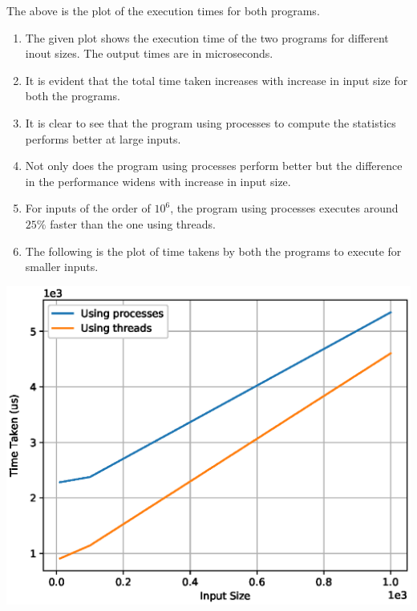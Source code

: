 \documentclass[a4paper,12pt]{report}
\begin{document}
The above is the plot of the execution times for both programs.
\newpage
\begin{enumerate}  
\item The given plot shows the execution time of the two programs for different inout sizes. The output times are in microseconds.
\item It is evident that the total time taken increases with increase in input size for both the programs.
\item It is clear to see that the program using processes to compute the statistics performs better at large inputs.
\item Not only does the program using processes perform better but the difference in the performance widens with increase in input size.
\item For inputs of the order of $10^6$, the program using processes executes around $25\%$ faster than the one using threads.
\item The following is the plot of time takens by both the programs to execute for smaller inputs.
\end{enumerate}
\begin{center}
\includegraphics{thread_early_domination.eps}
\end{center}
\newpage
\end{document}
